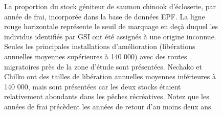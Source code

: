 \begin{figure}[htb]
    \centering
    \caption{La proportion du stock géniteur de saumon chinook d'écloserie, par année de frai, incorporée dans la base de données EPF. La ligne rouge horizontale représente le seuil de marquage en deçà duquel les individus identifiés par GSI ont été assignés à une origine inconnue. Seules les principales installations d'amélioration (libérations annuelles moyennes supérieures à 140 000) avec des routes migratoires près de la zone d'étude sont présentées. Nechako et Chilko ont des tailles de libération annuelles moyennes inférieures à 140 000, mais sont présentées car les deux stocks étaient relativement abondants dans les pêches récréatives. Notez que les années de frai précèdent les années de retour d'au moins deux ans.}
    \label{fig:pbt-coverage}
\end{figure}

